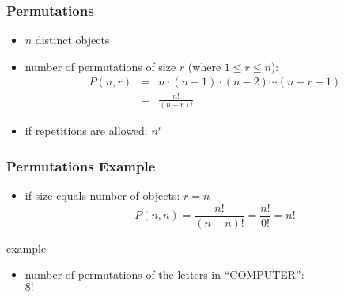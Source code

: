 \documentclass[dvipsnames]{beamer}
\begin{document}
\begin{frame}
  \frametitle{Permutations}

  \begin{itemize}
    \item $n$ distinct objects
    \item number of permutations of size $r$ (where $1 \leq r \leq n$):\\
    \begin{eqnarray*}
      P(n,r) & = & n \cdot (n-1) \cdot (n-2) \cdots (n-r+1)\\
             & = & \frac{n!}{(n-r)!}
    \end{eqnarray*}

    \pause
    \medskip
    \item if repetitions are allowed: $n^r$
  \end{itemize}
\end{frame}

\begin{frame}
  \frametitle{Permutations Example}

  \begin{itemize}
    \item if size equals number of objects: $r = n$
    \[
      P(n,n) = \frac{n!}{(n-n)!} = \frac{n!}{0!} = n!
    \]
  \end{itemize}

  \pause
  \begin{exampleblock}{example}
    \begin{itemize}
      \item number of permutations of the letters in ``COMPUTER'':\\
        $8!$
    \end{itemize}
  \end{exampleblock}
\end{frame}
\end{document}
